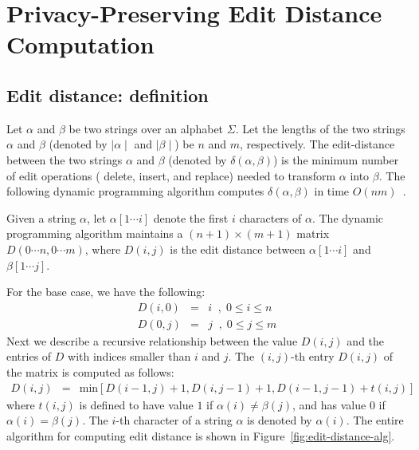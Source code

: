 \section{Privacy-Preserving Edit Distance Computation}
\label{sec:protocols}

\subsection{Edit distance: definition}
\label{sec:edit-distance}

Let $\alpha$ and $\beta$ be two strings over an alphabet $\Sigma$.
Let the lengths of the two strings $\alpha$ and $\beta$ (denoted by $ \mid
\alpha \mid $ and $ \mid \beta \mid $) be $n$ and $m$, respectively. The
edit-distance between the two strings $\alpha$ and $\beta$ (denoted by
$\delta (\alpha,\beta)$) is the minimum number of edit operations ({\sf
delete}, {\sf insert}, and {\sf replace}) needed to transform $\alpha$
into $\beta$.  The following dynamic programming algorithm computes
$\delta (\alpha,\beta)$ in time $O(nm)$~\cite{Gusfield}.

Given a string $\alpha$, let $\alpha [1 \cdots i]$ denote the first $i$
characters of $\alpha$.  The dynamic programming algorithm maintains a
$(n+1) \times (m+1)$ matrix $D(0 \cdots n, 0 \cdots m)$, where $D(i,j)$ is
the edit distance between $\alpha [1 \cdots i]$ and $\beta [1 \cdots j]$.

For the base case, we have the following:
\begin{eqnarray}
\label{eqn:base-case}
D(i,0) & = & i \;\; , \; 0 \leq i \leq n \\
D(0,j) & = & j \;\; , \; 0 \leq j \leq m
\end{eqnarray}
Next we describe a recursive relationship between the value $D(i,j)$ 
and the entries of $D$ with indices smaller than $i$ and $j$.
The $(i,j)$-th entry $D(i,j)$ of the matrix is computed as follows:
\begin{eqnarray}
\label{eqn:recursive}
D(i,j) & = & \mbox{min} [ D(i-1,j) + 1, D(i,j-1)+1,  D(i-1,j-1)+t(i,j) ] 
\end{eqnarray}
where $t(i,j)$ is defined to have value $1$ if $\alpha (i) \not= \beta
(j)$, and has value $0$ if $\alpha (i) = \beta (j)$. The $i$-th character
of a string $\alpha$ is denoted by $\alpha (i)$. The entire algorithm for
computing edit distance is shown in Figure~\ref{fig:edit-distance-alg}.

